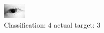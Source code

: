 \begin{figure}[h!]
\begin{center}
\includegraphics[width=0.60\columnwidth]{figures/ID24_class_4_target_3.png}
\end{center}
\caption{ Classification: 4 actual target: 3}
\label{fig:ID24_class_4_target_3}
\end{figure}
